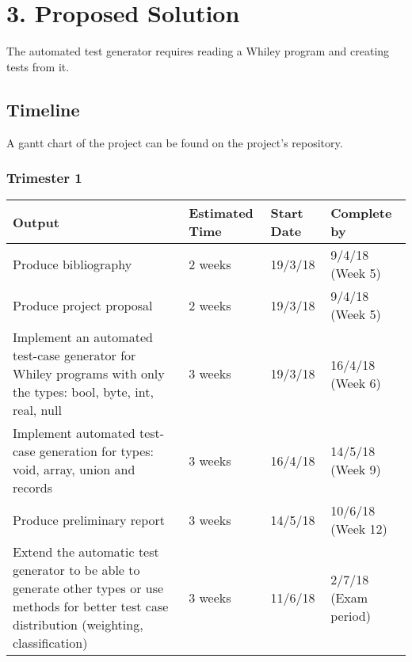 \documentclass[11pt, a4paper, twoside, openright]{report}
\begin{document}
\section*{3. Proposed Solution}

The automated test generator requires reading a Whiley program and creating tests from it.


\subsection*{Timeline}
A gantt chart of the project can be found on the project's repository.
\subsubsection*{Trimester 1}
\begin{tabular}{ |p{10cm}|p{2cm}|p{2cm}|p{2cm}| }
	\hline
	\textbf{Output} & \textbf{Estimated Time} &
	\textbf{Start Date} & \textbf{Complete by}\\
	\hline
	Produce bibliography & 2 weeks & 19/3/18
	& 9/4/18 (Week 5) \\
	\hline
	Produce project proposal & 2 weeks & 19/3/18 & 9/4/18 (Week 5) \\
	\hline
	Implement an automated test-case generator for Whiley programs with only the types:  bool, byte, int, real, null & 3 weeks & 19/3/18 & 16/4/18 (Week 6) \\
	
	\hline
	Implement automated test-case generation for types: void, array, union and records & 3 weeks & 16/4/18 & 14/5/18 (Week 9) \\
	\hline
	Produce preliminary report & 3 weeks & 14/5/18 & 10/6/18 (Week 12) \\	
	\hline
	Extend the automatic test generator to be able to generate other types or use methods for better test case distribution (weighting, classification) & 3 weeks & 11/6/18 & 2/7/18 (Exam period) \\
	\hline
\end{tabular}
\end{document}
